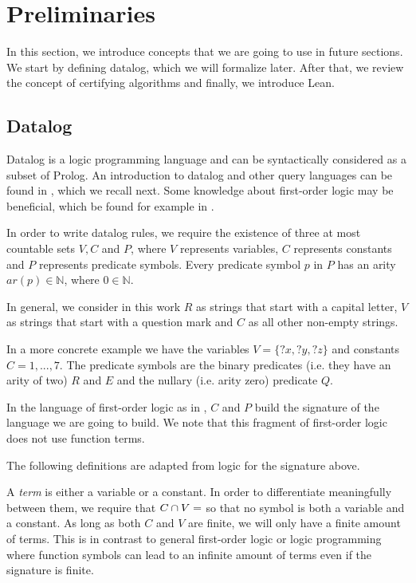 \section{Preliminaries}\label{sec:prelim}


In this section, we introduce concepts that we are going to use in future sections. We start by defining datalog, which we will formalize later. After that, we review the concept of certifying algorithms and finally, we introduce Lean.


\subsection{Datalog}
Datalog is a logic programming language and can be syntactically considered as a subset of Prolog. An introduction to datalog and other query languages can be found in \cite{alice}, which we recall next. Some knowledge about first-order logic may be beneficial, which be found for example in \cite{logic}.

In order to write datalog rules, we require the existence of three at most countable sets $V, C$ and $P$, where $V$ represents variables, $C$ represents constants and $P$ represents predicate symbols. Every predicate symbol $p$ in $P$ has an arity $ar(p) \in \mathbb{N}$, where $0 \in \mathbb{N}$.

\begin{example}
    In general, we consider in this work $R$ as strings that start with a capital letter, $V$ as strings that start with a question mark and $C$ as all other non-empty strings.
\end{example}

\begin{example}
In a more concrete example we have the variables $V= \{?x,?y,?z\}$ and constants $C= {1,...,7}$. The predicate symbols are the binary predicates (i.e. they have an arity of two) $R$ and $E$ and the nullary (i.e. arity zero) predicate $Q$.
\end{example}

In the language of first-order logic as in \cite{logic}, $C$ and $P$ build the signature of the language we are going to build. We note that this fragment of first-order logic does not use function terms.

The following definitions are adapted from logic for the signature above.

A \textit{term} is either a variable or a constant. In order to differentiate meaningfully between them, we require that $C \cap V = \empty$ so that no symbol is both a variable and a constant. As long as both $C$ and $V$ are finite, we will only have a finite amount of terms. This is in contrast to general first-order logic or logic programming where function symbols can lead to an infinite amount of terms even if the signature is finite.

